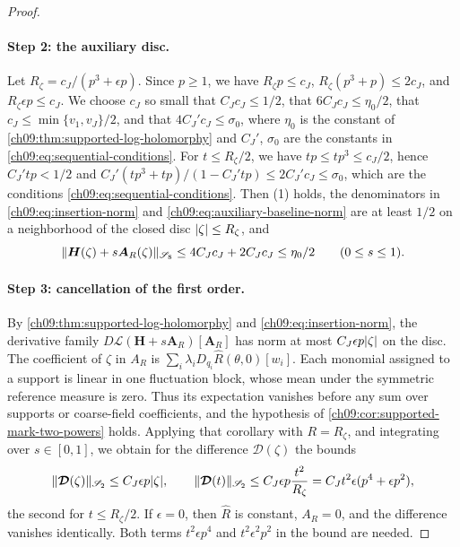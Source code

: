 \begin{proof}
\paragraph{Step 2: the auxiliary disc.}
Let $R_\zeta=c_J/(p^3+\epsilon p)$. Since $p\ge1$, we have $R_\zeta p\le c_J$, $R_\zeta(p^3+p)\le2c_J$, and $R_\zeta\epsilon p\le c_J$. We choose $c_J$ so small that $C_Jc_J\le1/2$, that $6C_Jc_J\le\eta_0/2$, that $c_J\le\min\{v_1,v_J\}/2$, and that $4C_J'c_J\le\sigma_0$, where $\eta_0$ is the constant of \cref{ch09:thm:supported-log-holomorphy} and $C_J'$, $\sigma_0$ are the constants in \eqref{ch09:eq:sequential-conditions}. For $t\le R_\zeta/2$, we have $tp\le tp^3\le c_J/2$, hence $C_J'tp<1/2$ and $C_J'(tp^3+tp)/(1-C_J'tp)\le2C_J'c_J\le\sigma_0$, which are the conditions \eqref{ch09:eq:sequential-conditions}. Then (1) holds, the denominators in \eqref{ch09:eq:insertion-norm} and \eqref{ch09:eq:auxiliary-baseline-norm} are at least $1/2$ on a neighborhood of the closed disc $\lvert \zeta\rvert\le R_\zeta$, and
\[
 \lVert \boldsymbol H(\zeta)+s\boldsymbol A_R(\zeta)\rVert_{\mathscr S_8}\le4C_Jc_J+2C_Jc_J\le\eta_0/2\qquad(0\le s\le1).
\]

\paragraph{Step 3: cancellation of the first order.}
By \cref{ch09:thm:supported-log-holomorphy} and \eqref{ch09:eq:insertion-norm}, the derivative family $D\boldsymbol{\mathcal L}(\boldsymbol H+s\boldsymbol A_R)[\boldsymbol A_R]$ has norm at most $C_J\epsilon p\lvert \zeta\rvert$ on the disc. The coefficient of $\zeta$ in $A_R$ is $\sum_i\lambda_iD_{q_i}\widehat R(\theta,0)[w_i]$. Each monomial assigned to a support is linear in one fluctuation block, whose mean under the symmetric reference measure is zero. Thus its expectation vanishes before any sum over supports or coarse-field coefficients, and the hypothesis of \cref{ch09:cor:supported-mark-two-powers} holds. Applying that corollary with $R=R_\zeta$, and integrating over $s\in[0,1]$, we obtain for the difference $\boldsymbol{\mathcal D}(\zeta)$ the bounds
\begin{equation}\label{ch09:eq:marked-linear-bound}
 \lVert \boldsymbol{\mathcal D}(\zeta)\rVert_{\mathscr S_2}\le C_J\epsilon p\lvert \zeta\rvert,\qquad
 \lVert \boldsymbol{\mathcal D}(t)\rVert_{\mathscr S_2}\le C_J\epsilon p\frac{t^2}{R_\zeta}=C_Jt^2\epsilon(p^4+\epsilon p^2),
\end{equation}
the second for $t\le R_\zeta/2$. If $\epsilon=0$, then $\widehat R$ is constant, $A_R=0$, and the difference vanishes identically. Both terms $t^2\epsilon p^4$ and $t^2\epsilon^2p^2$ in the bound are needed.


\end{proof}
